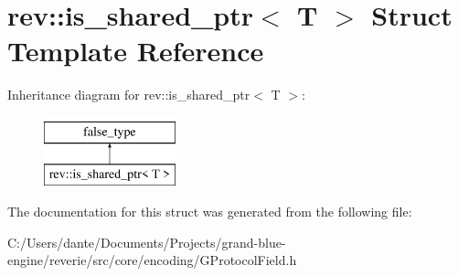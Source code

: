 \hypertarget{structrev_1_1is__shared__ptr}{}\section{rev\+::is\+\_\+shared\+\_\+ptr$<$ T $>$ Struct Template Reference}
\label{structrev_1_1is__shared__ptr}
Inheritance diagram for rev\+::is\+\_\+shared\+\_\+ptr$<$ T $>$\+:\begin{figure}[H]
\begin{center}
\leavevmode
\includegraphics[height=2.000000cm]{structrev_1_1is__shared__ptr}
\end{center}
\end{figure}


The documentation for this struct was generated from the following file\+:\begin{DoxyCompactItemize}
\item 
C\+:/\+Users/dante/\+Documents/\+Projects/grand-\/blue-\/engine/reverie/src/core/encoding/G\+Protocol\+Field.\+h\end{DoxyCompactItemize}
